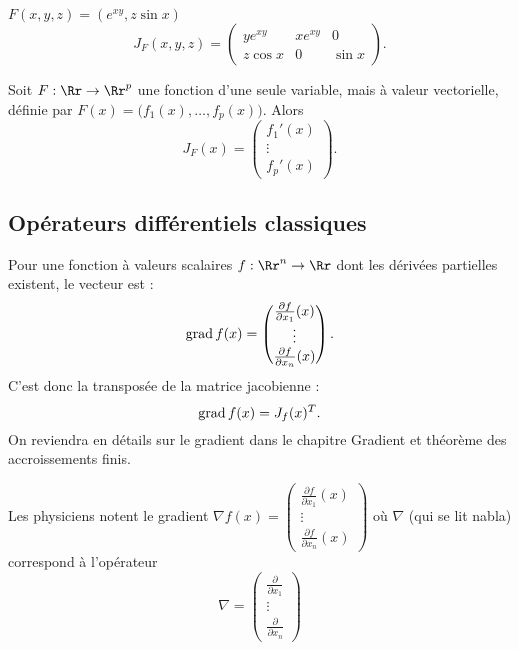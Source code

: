 \documentclass[12pt, class=report,crop=false]{standalone}
\begin{document}
\begin{exemple}
$F(x,y,z)=(e^{xy},z\sin x)$
$$J _F(x,y,z)=\begin{pmatrix}
y e^{xy}&x e^{xy}&0 \\ z\cos x &0&\sin x 
\end{pmatrix}.$$
\end{exemple}

\begin{exemple}
Soit $F : \Rr \to \Rr^p$ une fonction d'une seule variable, mais à valeur vectorielle, définie par 
$F(x) = \big( f_1(x), \ldots,f_p(x) \big)$.
Alors 
$$J_F(x) =\begin{pmatrix}
f_1'(x) \\ \vdots \\ f_p'(x) 
\end{pmatrix}.$$ 
\end{exemple}


\subsection{Opérateurs différentiels classiques}
 

Pour une fonction à valeurs scalaires $f : \Rr^n \to \Rr$ 
dont les dérivées partielles existent, le vecteur  est :
$$\operatorname{grad} f (x) = \begin{pmatrix}
\frac{\partial f}{\partial x_1}(x)\\
\vdots \\
\frac{\partial f}{\partial x_n}(x)
\end{pmatrix}.$$
C'est donc la transposée de la matrice jacobienne : 
$$\operatorname{grad} f(x) = J_f (x)^T.$$
On reviendra en détails sur le gradient dans le chapitre \og{}Gradient et théorème des accroissements finis\fg{}.

Les physiciens notent le gradient $\nabla f (x) =
\begin{pmatrix} 
\frac{\partial f}{\partial x_1}(x)\\
\vdots \\ 
\frac{\partial f}{\partial x_n}(x)
\end{pmatrix}$
où $\nabla$ (qui se lit \og{}nabla\fg{}) correspond à l'opérateur
$$\nabla = \begin{pmatrix} 
\frac{\partial}{\partial x_1}\\
\vdots\\
\frac{\partial }{\partial x_n}\end{pmatrix}
$$
\end{document}

